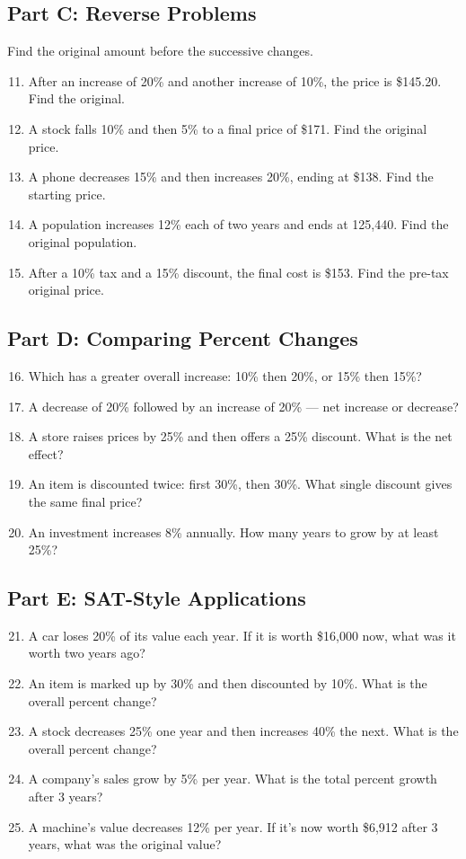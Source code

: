 \documentclass[12pt]{article}
\begin{document}
\subsection*{Part C: Reverse Problems}
Find the original amount before the successive changes.
\begin{enumerate}
  \setcounter{enumi}{10}
  \item After an increase of 20\% and another increase of 10\%, the price is \$145.20. Find the original.
  \item A stock falls 10\% and then 5\% to a final price of \$171. Find the original price.
  \item A phone decreases 15\% and then increases 20\%, ending at \$138. Find the starting price.
  \item A population increases 12\% each of two years and ends at 125,440. Find the original population.
  \item After a 10\% tax and a 15\% discount, the final cost is \$153. Find the pre-tax original price.
\end{enumerate}

\subsection*{Part D: Comparing Percent Changes}
\begin{enumerate}
  \setcounter{enumi}{15}
  \item Which has a greater overall increase: 10\% then 20\%, or 15\% then 15\%?
  \item A decrease of 20\% followed by an increase of 20\% — net increase or decrease?
  \item A store raises prices by 25\% and then offers a 25\% discount. What is the net effect?
  \item An item is discounted twice: first 30\%, then 30\%. What single discount gives the same final price?
  \item An investment increases 8\% annually. How many years to grow by at least 25\%?
\end{enumerate}

\subsection*{Part E: SAT-Style Applications}
\begin{enumerate}
  \setcounter{enumi}{20}
  \item A car loses 20\% of its value each year. If it is worth \$16,000 now, what was it worth two years ago?
  \item An item is marked up by 30\% and then discounted by 10\%. What is the overall percent change?
  \item A stock decreases 25\% one year and then increases 40\% the next. What is the overall percent change?
  \item A company’s sales grow by 5\% per year. What is the total percent growth after 3 years?
  \item A machine’s value decreases 12\% per year. If it’s now worth \$6,912 after 3 years, what was the original value?
\end{enumerate}
\end{document}
